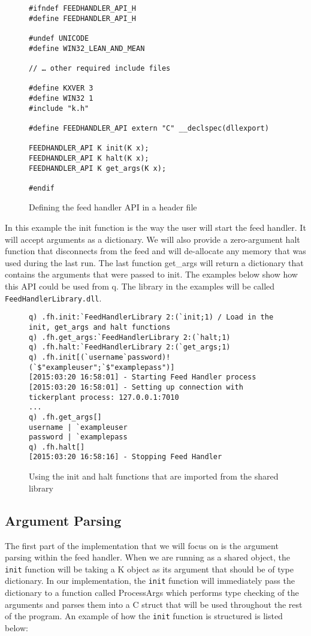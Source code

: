 \begin{figure}
\begin{lstlisting}
#ifndef FEEDHANDLER_API_H
#define FEEDHANDLER_API_H

#undef UNICODE
#define WIN32_LEAN_AND_MEAN

// … other required include files

#define KXVER 3
#define WIN32 1
#include "k.h"

#define FEEDHANDLER_API extern "C" __declspec(dllexport)

FEEDHANDLER_API K init(K x);
FEEDHANDLER_API K halt(K x);
FEEDHANDLER_API K get_args(K x);

#endif
\end{lstlisting}
\caption{Defining the feed handler API in a header file}
\end{figure}

In this example the init function is the way the user will start the feed handler. It will accept
arguments as a dictionary. We will also provide a zero-argument halt function that disconnects from
the feed and will de-allocate any memory that was used during the last run. The last function get\_args
will return a dictionary that contains the arguments that were passed to init. The examples below show
how this API could be used from q. The library in the examples will be called \verb|FeedHandlerLibrary.dll|.

\begin{figure}
\begin{lstlisting}
q) .fh.init:`FeedHandlerLibrary 2:(`init;1) / Load in the init, get_args and halt functions
q) .fh.get_args:`FeedHandlerLibrary 2:(`halt;1)
q) .fh.halt:`FeedHandlerLibrary 2:(`get_args;1)
q) .fh.init[(`username`password)!(`$"exampleuser";`$"examplepass")]
[2015:03:20 16:58:01] - Starting Feed Handler process
[2015:03:20 16:58:01] - Setting up connection with tickerplant process: 127.0.0.1:7010
...
q) .fh.get_args[]
username | `exampleuser
password | `examplepass
q) .fh.halt[]
[2015:03:20 16:58:16] - Stopping Feed Handler 
\end{lstlisting}
\caption{Using the init and halt functions that are imported from the shared library}
\end{figure}

\subsection{Argument Parsing}

The first part of the implementation that we will focus on is the argument parsing within the
feed handler. When we are running as a shared object, the \verb|init| function will be taking
a K object as its argument that should be of type dictionary. In our implementation, the \verb|init|
function will immediately pass the dictionary to a function called ProcessArgs which performs type checking of the arguments and parses them into a C struct that will be used throughout the rest of the program.
An example of how the \verb|init| function is structured is listed below:

